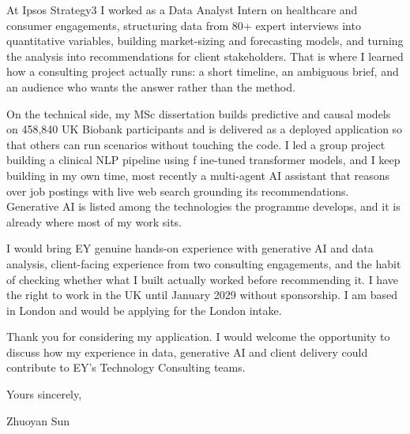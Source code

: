 \documentclass[letterpaper,11pt]{article}
\begin{document}
At Ipsos Strategy3 I worked as a Data Analyst Intern on healthcare and consumer engagements, structuring data from 80+ expert interviews into quantitative variables, building market-sizing and forecasting models, and turning the analysis into recommendations for client stakeholders. That is where I learned how a consulting project actually runs: a short timeline, an ambiguous brief, and an audience who wants the answer rather than the method.

On the technical side, my MSc dissertation builds predictive and causal models on 458,840 UK Biobank participants and is delivered as a deployed application so that others can run scenarios without touching the code. I led a group project building a clinical NLP pipeline using f\kern0pt ine-tuned transformer models, and I keep building in my own time, most recently a multi-agent AI assistant that reasons over job postings with live web search grounding its recommendations. Generative AI is listed among the technologies the programme develops, and it is already where most of my work sits.

I would bring EY genuine hands-on experience with generative AI and data analysis, client-facing experience from two consulting engagements, and the habit of checking whether what I built actually worked before recommending it. I have the right to work in the UK until January 2029 without sponsorship. I am based in London and would be applying for the London intake.

Thank you for considering my application. I would welcome the opportunity to discuss how my experience in data, generative AI and client delivery could contribute to EY's Technology Consulting teams.

\vspace{2pt}
Yours sincerely,

\vspace{8pt}
Zhuoyan Sun
\end{document}
